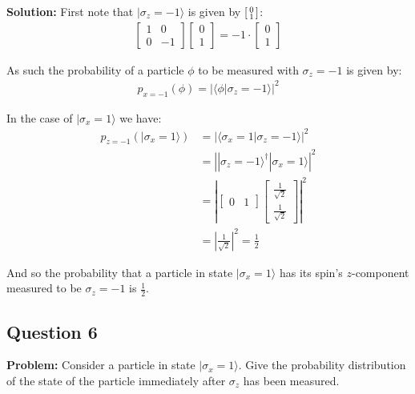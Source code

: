 \documentclass{article}
\newcommand{\icol}[1]{%
  \begin{bsmallmatrix}#1\end{bsmallmatrix}%
}
\begin{document}
\noindent\textbf{Solution:} First note that $|\sigma_z=-1\rangle$ is given by $\icol{0\\1}$:
\begin{align*}
    \begin{bmatrix}
        1&0\\0&-1
    \end{bmatrix}\begin{bmatrix}
        0\\1
    \end{bmatrix}=-1\cdot\begin{bmatrix}
        0\\1
    \end{bmatrix}
\end{align*} 

As such the probability of a particle $\phi$ to be measured with $\sigma_z=-1$ is given by:
\begin{align*}
    p_{x=-1}(\phi)=\left|\langle\phi|\sigma_z=-1\rangle\right|^2
\end{align*}

In the case of $|\sigma_x=1\rangle$ we have:
\begin{align*}
    p_{z=-1}(|\sigma_x=1\rangle)&=\left|\langle\sigma_x=1|\sigma_z=-1\rangle\right|^2\\
    &=\left||\sigma_z=-1\rangle^\dagger|\sigma_x=1\rangle\right|^2\\
    &=\left|\begin{bmatrix}
        0&1
    \end{bmatrix}\begin{bmatrix}
        \frac{1}{\sqrt{2}}\\\frac{1}{\sqrt{2}}
    \end{bmatrix}\right|^2\\
    &=\left|\frac{1}{\sqrt{2}}\right|^2=\frac{1}{2}
\end{align*}

And so the probability that a particle in state $|\sigma_x=1\rangle$ has its spin's $z$-component measured to be $\sigma_z=-1$ is $\frac{1}{2}$.

\subsection*{Question 6}
\noindent\textbf{Problem:} Consider a particle in state $|\sigma_x=1\rangle$. Give the probability distribution of the state of the particle immediately after $\sigma_z$ has been measured.
\bigskip
\end{document}
